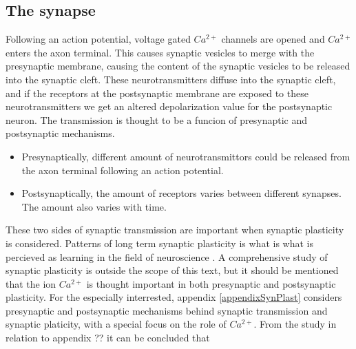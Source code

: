 \subsection{The synapse}
\label{ssecTheSynapse}
Following an action potential, voltage gated $Ca^{2+}$ channels are opened and $Ca^{2+}$ enters the axon terminal.
This causes synaptic vesicles to merge with the presynaptic membrane, causing the content of the synaptic vesicles to be released into the synaptic cleft. %
These neurotransmitters diffuse into the synaptic cleft, and if the receptors at the postsynaptic membrane are exposed to these neurotransmitters we get an altered depolarization value for the postsynaptic neuron.
The transmission is thought to be a funcion of presynaptic and postsynaptic mechanisms.

\begin{itemize}
	\item Presynaptically, different amount of neurotransmittors could be released from the axon terminal following an action potential.
	\item Postsynaptically, the amount of receptors varies between different synapses. The amount also varies with time.%
\end{itemize}

These two sides of synaptic transmission are important when synaptic plasticity is considered. 
Patterns of long term synaptic plasticity is what is what is percieved as learning in the field of neuroscience \cite{NeuroscienceExploringTheBrain3edKAP25}.
A comprehensive study of synaptic plasticity is outside the scope of this text, but it should be mentioned that the ion $Ca^{2+}$ is thought important in both presynaptic and postsynaptic plasticity.
For the especially interrested, appendix \ref{appendixSynPlast} considers presynaptic and postsynaptic mechanisms behind synaptic transmission and synaptic platicity, with a special focus on the role of $Ca^{2+}$.
From the study in relation to appendix ??%
											it can be concluded that 



